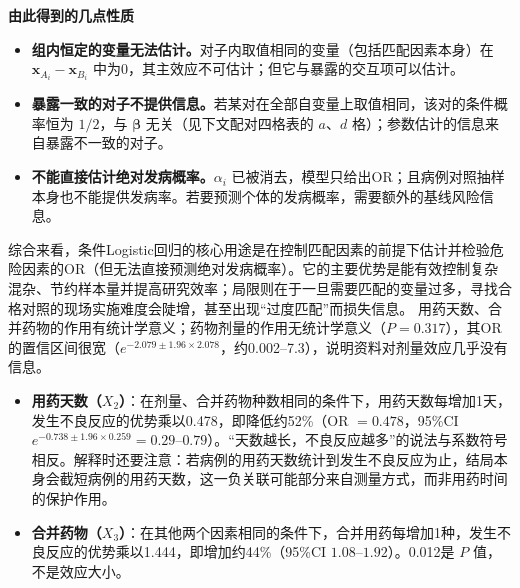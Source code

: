 \textbf{由此得到的几点性质}
\begin{itemize}
\item \textbf{组内恒定的变量无法估计。}对子内取值相同的变量（包括匹配因素本身）在 $\bm x_{A_i}-\bm x_{B_i}$ 中为0，其主效应不可估计；但它与暴露的交互项可以估计。
\item \textbf{暴露一致的对子不提供信息。}若某对在全部自变量上取值相同，该对的条件概率恒为 $1/2$，与 $\bm\beta$ 无关（见下文配对四格表的 $a$、$d$ 格）；参数估计的信息来自暴露不一致的对子。
\item \textbf{不能直接估计绝对发病概率。}$\alpha_i$ 已被消去，模型只给出OR；且病例对照抽样本身也不能提供发病率。若要预测个体的发病概率，需要额外的基线风险信息。
\end{itemize}
综合来看，条件Logistic回归的核心用途是在控制匹配因素的前提下估计并检验危险因素的OR（但无法直接预测绝对发病概率）。它的主要优势是能有效控制复杂混杂、节约样本量并提高研究效率；局限则在于一旦需要匹配的变量过多，寻找合格对照的现场实施难度会陡增，甚至出现“过度匹配”而损失信息。
用药天数、合并药物的作用有统计学意义；药物剂量的作用无统计学意义（$P=0.317$），其OR的置信区间很宽（$e^{-2.079\pm1.96\times2.078}$，约0.002--7.3），说明资料对剂量效应几乎没有信息。
\begin{itemize}
\item \textbf{用药天数（$X_2$）}：在剂量、合并药物种数相同的条件下，用药天数每增加1天，发生不良反应的优势乘以0.478，即降低约52\%（OR $=0.478$，95\%CI $e^{-0.738\pm1.96\times0.259}=0.29$--$0.79$）。“天数越长，不良反应越多”的说法与系数符号相反。解释时还要注意：若病例的用药天数统计到发生不良反应为止，结局本身会截短病例的用药天数，这一负关联可能部分来自测量方式，而非用药时间的保护作用。
\item \textbf{合并药物（$X_3$）}：在其他两个因素相同的条件下，合并用药每增加1种，发生不良反应的优势乘以1.444，即增加约44\%（95\%CI $1.08$--$1.92$）。0.012是 $P$ 值，不是效应大小。
\end{itemize}
